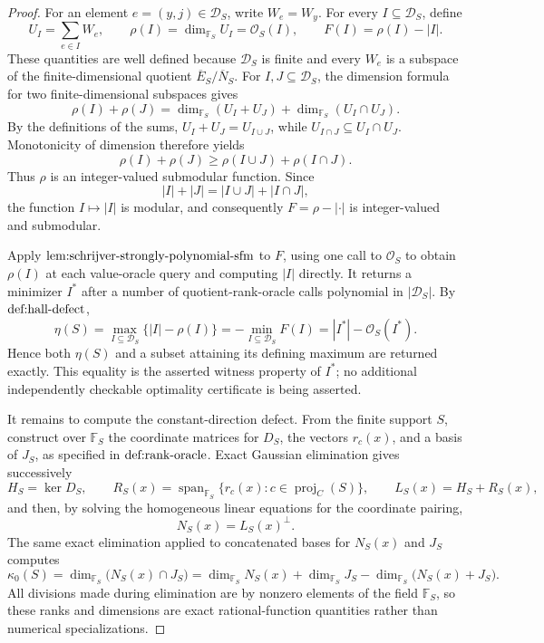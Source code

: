 \documentclass{article}
\begin{document}
\begin{proof}
For an element \(e=(y,j)\in\mathcal D_S\), write \(W_e=W_y\).  For every \(I\subseteq\mathcal D_S\), define
\[
 U_I=\sum_{e\in I}W_e,
 \qquad
 \rho(I)=\dim_{\mathbb F_S}U_I=\mathcal O_S(I),
 \qquad
 F(I)=\rho(I)-|I|.
\]
These quantities are well defined because \(\mathcal D_S\) is finite and every \(W_e\) is a subspace of the finite-dimensional quotient \(\overline E_S/\overline N_S\).  For \(I,J\subseteq\mathcal D_S\), the dimension formula for two finite-dimensional subspaces gives
\[
 \rho(I)+\rho(J)
 =\dim_{\mathbb F_S}(U_I+U_J)
  +\dim_{\mathbb F_S}(U_I\cap U_J).
\]
By the definitions of the sums, \(U_I+U_J=U_{I\cup J}\), while \(U_{I\cap J}\subseteq U_I\cap U_J\).  Monotonicity of dimension therefore yields
\[
 \rho(I)+\rho(J)
 \geq \rho(I\cup J)+\rho(I\cap J).
\]
Thus \(\rho\) is an integer-valued submodular function.  Since
\[
 |I|+|J|=|I\cup J|+|I\cap J|,
\]
the function \(I\mapsto |I|\) is modular, and consequently \(F=\rho-|\cdot|\) is integer-valued and submodular.

Apply \(\textnormal{lem:schrijver-strongly-polynomial-sfm}\) to \(F\), using one call to \(\mathcal O_S\) to obtain \(\rho(I)\) at each value-oracle query and computing \(|I|\) directly.  It returns a minimizer \(I^*\) after a number of quotient-rank-oracle calls polynomial in \(|\mathcal D_S|\).  By \(\textnormal{def:hall-defect}\),
\[
 \eta(S)
 =\max_{I\subseteq\mathcal D_S}\bigl\{|I|-\rho(I)\bigr\}
 =-\min_{I\subseteq\mathcal D_S}F(I)
 =|I^*|-\mathcal O_S(I^*).
\]
Hence both \(\eta(S)\) and a subset attaining its defining maximum are returned exactly.  This equality is the asserted witness property of \(I^*\); no additional independently checkable optimality certificate is being asserted.

It remains to compute the constant-direction defect.  From the finite support \(S\), construct over \(\mathbb F_S\) the coordinate matrices for \(D_S\), the vectors \(r_c(x)\), and a basis of \(J_S\), as specified in \(\textnormal{def:rank-oracle}\).  Exact Gaussian elimination gives successively
\[
 H_S=\ker D_S,
 \qquad
 R_S(x)=\operatorname{span}_{\mathbb F_S}\{r_c(x):c\in\operatorname{proj}_C(S)\},
 \qquad
 L_S(x)=H_S+R_S(x),
\]
and then, by solving the homogeneous linear equations for the coordinate pairing,
\[
 N_S(x)=L_S(x)^\perp.
\]
The same exact elimination applied to concatenated bases for \(N_S(x)\) and \(J_S\) computes
\[
 \kappa_0(S)
 =\dim_{\mathbb F_S}\bigl(N_S(x)\cap J_S\bigr)
 =\dim_{\mathbb F_S}N_S(x)+\dim_{\mathbb F_S}J_S
  -\dim_{\mathbb F_S}\bigl(N_S(x)+J_S\bigr).
\]
All divisions made during elimination are by nonzero elements of the field \(\mathbb F_S\), so these ranks and dimensions are exact rational-function quantities rather than numerical specializations.


\end{proof}
\end{document}
